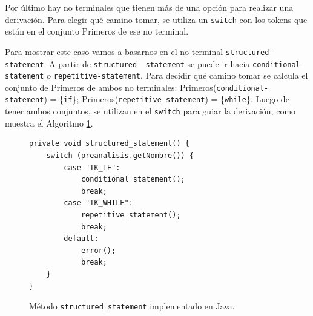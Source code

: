 

Por último hay no terminales que tienen más de una opción para realizar una derivación. Para elegir qué camino tomar, se utiliza un \texttt{switch} con los tokens que están en el conjunto Primeros de ese no terminal.

Para mostrar este caso vamos a basarnos en el no terminal \texttt{structured-statement}. A partir de \texttt{structured- statement} se puede ir hacia \texttt{conditional-statement} o \texttt{repetitive-statement}. Para decidir qué camino tomar se calcula el conjunto de Primeros de ambos no terminales: Primeros(\texttt{conditional-statement}) = \{\texttt{if}\}; Primeros(\texttt{repetitive-statement}) = \{\texttt{while}\}. Luego de tener ambos conjuntos, se utilizan en el \texttt{switch} para guiar la derivación, como muestra el Algoritmo \ref{fig:metodo_structured_statement}.

\begin{figure}[H]
\begin{verbatim}
private void structured_statement() {
	switch (preanalisis.getNombre()) {
		case "TK_IF":
			conditional_statement();
			break;
		case "TK_WHILE":
			repetitive_statement();
			break;
		default:
			error();
			break;
	}
}
\end{verbatim}
\caption{Método \texttt{structured\_statement} implementado en Java.}
\label{fig:metodo_structured_statement}
\end{figure}


